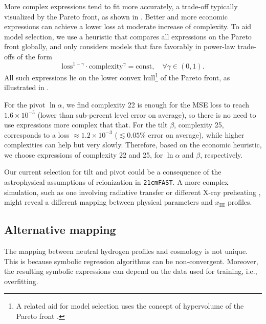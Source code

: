 \documentclass[12pt, a4paper]{article}
\newcommand{\HI}{\mathrm{HI}}
\newcommand{\ap}{\alpha}
\newcommand{\tilt}{\beta}
\begin{document}
More complex expressions tend to fit more accurately, a trade-off
typically visualized by the Pareto front, as shown in .
Better and more economic expressions can achieve a lower loss at
moderate increase of complexity.
To aid model selection, we use a heuristic that compares all expressions
on the Pareto front globally, and only considers models that fare
favorably in power-law trade-offs of the form
%
\begin{equation}
\mathrm{loss}^{1 - \gamma} \cdot \mathrm{complexity}^\gamma
= \mathrm{const}, \quad \forall \gamma \in (0, 1).
\end{equation}
All such expressions lie on the lower convex hull\footnote{A related aid
for model selection uses the concept of hypervolume of the Pareto front
\cite{Cao2015}.} of the Pareto front, as illustrated in
.

For the pivot $\ln\ap$, we find complexity 22 is enough for the MSE loss
to reach $1.6 \times 10^{-5}$ (lower than sub-percent level error on
average), so there is no need to use expressions more complex that that.
For the tilt $\tilt$, complexity 25, corresponds to a loss $\approx
1.2\times10^{-3}$ ($\lesssim 0.05\%$ error on average), while higher
complexities can help but very slowly.
Therefore, based on the economic heuristic, we choose expressions of
complexity 22 and 25, for $\ln\ap$ and $\tilt$, respectively.

Our current selection for tilt and pivot could be a consequence of the
astrophysical assumptions of reionization in \texttt{21cmFAST}.
A more complex simulation, such as one involving radiative transfer or
different X-ray preheating \cite{Montero2024}, might reveal a different
mapping between physical parameters and $x_\HI$ profiles.


\subsection*{Alternative mapping}
\label{sec:SRHalf}

The mapping between neutral hydrogen profiles and cosmology is not
unique.
This is because symbolic regression algorithms can be non-convergent.
Moreover, the resulting symbolic expressions can depend on the data used
for training, i.e., overfitting.
\end{document}
